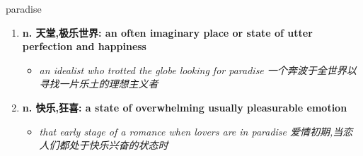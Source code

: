 
\begin{frame}
{\huge paradise}
\begin{center}
\begin{enumerate}\Large
  \item \textbf{n. 天堂,极乐世界: an often imaginary place or state of utter perfection and happiness}
  \begin{itemize}
    \item \em{\Large{an idealist who trotted the globe looking for paradise 一个奔波于全世界以寻找一片乐土的理想主义者}}
  \end{itemize}
  \item \textbf{n. 快乐,狂喜: a state of overwhelming usually pleasurable emotion}
  \begin{itemize}
    \item \em{\Large{that early stage of a romance when lovers are in paradise 爱情初期,当恋人们都处于快乐兴奋的状态时}}
  \end{itemize}
\end{enumerate}
\end{center}
\end{frame}
